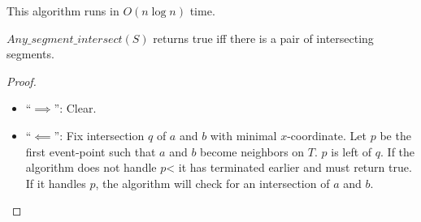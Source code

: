 This algorithm runs in $O(n \log n)$ time.

\begin{mylemma}
${Any\_segment\_intersect}(S)$ returns true iff there is a pair of intersecting segments.
\end{mylemma}
\begin{proof}
\begin{itemize}
		\item ``$\implies$'': Clear.
		\item ``$\impliedby$'': Fix intersection $q$ of $a$ and $b$ with minimal $x$-coordinate. Let $p$ be the first event-point such that $a$ and $b$ become neighbors on $T$. $p$ is left of $q$. If the algorithm does not handle $p$< it has terminated earlier and must return true. If it handles $p$, the algorithm will check for an intersection of $a$ and $b$.

	\end{itemize}

\end{proof}

